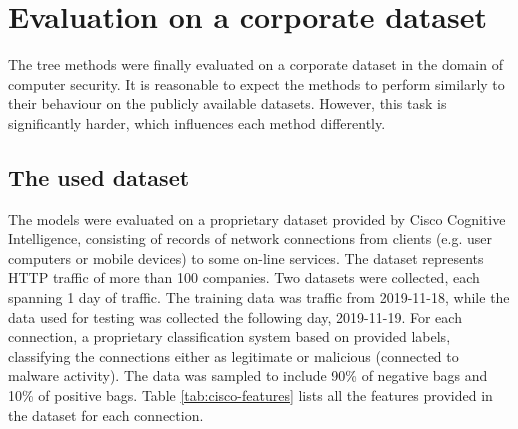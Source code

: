 \chapter{Evaluation on a corporate dataset}\label{chap:cisco-dataset}

The tree methods were finally evaluated on a corporate dataset in the domain of computer security. It is reasonable to expect the methods to perform similarly to their behaviour on the publicly available datasets. However, this task is significantly harder, which influences each method differently.

\section{The used dataset}

The models were evaluated on a proprietary dataset provided by Cisco Cognitive Intelligence, consisting of records of network connections from clients (e.g. user computers or mobile devices) to some on-line services. The dataset represents HTTP traffic of more than 100 companies. Two datasets were collected, each spanning 1 day of traffic. The training data was traffic from 2019-11-18, while the data used for testing was collected the following day, 2019-11-19. For each connection, a proprietary classification system based on \cite{jusko_graph-based_2017} provided labels, classifying the connections either as legitimate or malicious (connected to malware activity). The data was sampled to include 90\% of negative bags and 10\% of positive bags. Table \ref{tab:cisco-features} lists all the features provided in the dataset for each connection.


